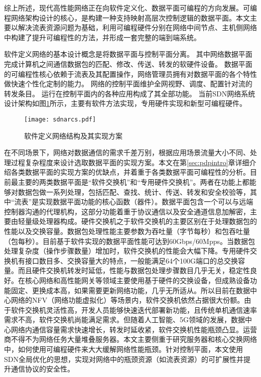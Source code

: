 综上所述，现代高性能网络正在向软件定义化、数据平面可编程的方向发展。可编程网络架构设计的核心，是构建一种支持映射高层次控制逻辑的数据平面。本文主要以解决流表资源问题为基础，利用可编程硬件分别在网络中间节点、主机侧网络中构建了提升可编程性的方法，并形成一套完整的端到端系统。

\label{chap112}

软件定义网络的基本设计概念是将数据平面与控制平面分离。
其中网络数据平面完成计算机之间通信数据包的匹配、修改、传送、转发的软硬件设备。
数据平面的可编程性核心依赖于流表及其配置操作，网络管理员拥有对数据平面的各个特性做快速个性化定制的能力。
网络的控制平面维护全网视野、调度、配置针对流的转发条目。
运行在控制平面内的各种应用构成了其全部功能。
当前SDN网络系统设计架构如图\ref{fig:sdnarcs}所示，主要有软件方法实现，专用硬件实现和新型可编程硬件。

\begin{figure}[!ht]
	\centering 
	\vspace{-1.5mm} 
	\texttt{[image: sdnarcs.pdf]}
	\caption{软件定义网络结构及其实现方案} \label{fig:sdnarcs}
\end{figure}

在不同场景下，网络对数据通信的需求千差万别，根据应用场景流量大小不同、处理过程复杂程度来设计选取数据平面的实现方案。本文在第\ref{sec:pdpintro}章详细介绍各类数据平面的实现方案的优缺点，并着重于各类数据平面可编程性的分析。目前最主要的两类数据平面是“软件交换机”和“专用硬件交换机”。两者在功能上都能够对数据包做一系列处理，包括匹配、查找、统计、传送、转发和安全校验等，其中“流表”是实现数据平面功能的核心函数（器件）。数据平面包含一个可以与远端控制器沟通的代理机构，这部分功能着重于协议通信以及安全通道信息加解密，主要由轻量级处理器构成。硬件交换机之于软件交换机的主要区别在于处理数据包的性能以及交换容量。数据包处理性能主要参数为吞吐量（字节每秒）和包吞吐量（包每秒）。目前基于软件实现的数据平面性能可达到60Gbps/60Mpps。当数据包处理复杂度（操作步骤数量）增加时，软件交换机的性能会大幅下降。专用硬件交换机有接口数目多、交换容量大的特点，一般能满足64个100G端口的总交换容量。而且硬件交换机转发时延低，性能与数据包处理步骤数目几乎无关，稳定性良好。在核心网络和高性能网关等领域主要使用基于硬件的交换设备，但成熟设备功能固定、更换成本高，如果需要更新网络功能，几乎无所适从。所以目前在数据中心网络的NFV（网络功能虚拟化）等场景内，软件交换机依然占据很大份额。由于软件交换机灵活性高，开发人员能够快速迭代部署新功能，且传统单机通信速率需求不高，软件交换机尚能满足需求。但随着人工智能、5G领域的发展，数据中心网络内通信容量需求快速增长，转发时延收紧，软件交换机性能瓶颈凸显。运营商不得不为网络任务大量堆叠服务器。本文主要侧重于研究服务器和核心交换网络中，如何使用可编程硬件来大大缓解网络性能瓶颈。针对控制平面，本文使用SDN全局优化的思想，实现对网络中的瓶颈资源（如流表资源）的可扩展性并提升通信协议的安全性。

